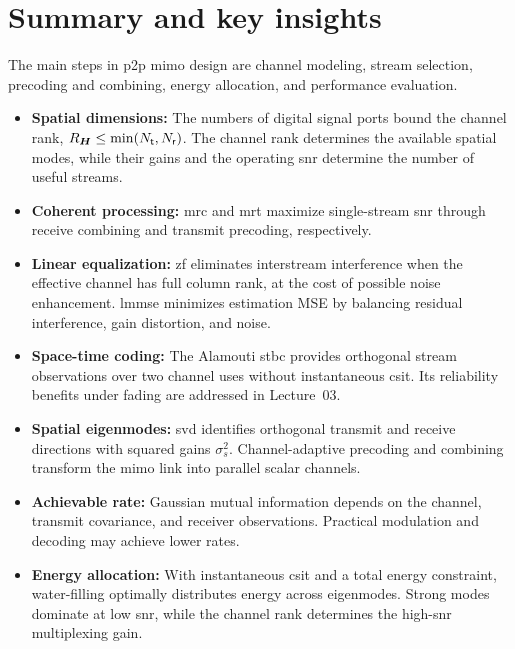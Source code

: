 \section{Summary and key insights}

The main steps in \ac{p2p} \ac{mimo} design are channel modeling, stream selection, precoding and combining, energy allocation, and performance evaluation.

\begin{itemize}
	\item \textbf{Spatial dimensions:}
	The numbers of digital signal ports bound the channel rank,
	$R_{\bm{H}}\leq\min(N_{\mathsf{t}},N_{\mathsf{r}})$.
	The channel rank determines the available spatial modes,
	while their gains and the operating \ac{snr} determine
	the number of useful streams.
	
	\item \textbf{Coherent processing:}
	\ac{mrc} and \ac{mrt} maximize single-stream \ac{snr}
	through receive combining and transmit precoding,
	respectively.
	
	\item \textbf{Linear equalization:}
	\ac{zf} eliminates interstream interference when the
	effective channel has full column rank, at the cost
	of possible noise enhancement.
	\ac{lmmse} minimizes estimation MSE by balancing
	residual interference, gain distortion, and noise.
	
	\item \textbf{Space-time coding:}
	The Alamouti \ac{stbc} provides orthogonal stream
	observations over two channel uses without
	instantaneous \ac{csit}. Its reliability benefits
	under fading are addressed in Lecture~03.
	
	\item \textbf{Spatial eigenmodes:}
	\ac{svd} identifies orthogonal transmit and receive
	directions with squared gains $\sigma_s^2$.
	Channel-adaptive precoding and combining transform
	the \ac{mimo} link into parallel scalar channels.
	
	\item \textbf{Achievable rate:}
	Gaussian mutual information depends on the channel,
	transmit covariance, and receiver observations.
	Practical modulation and decoding may achieve
	lower rates.
	
	\item \textbf{Energy allocation:}
	With instantaneous \ac{csit} and a total energy
	constraint, water-filling optimally distributes
	energy across eigenmodes.
	Strong modes dominate at low \ac{snr}, while the
	channel rank determines the high-\ac{snr}
	multiplexing gain.
\end{itemize}


